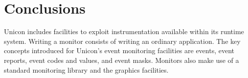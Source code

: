 \section{Conclusions}

Unicon includes facilities to exploit instrumentation available within its
runtime system.  Writing a monitor consists of writing an ordinary
application.  The key concepts introduced for Unicon's event monitoring
facilities are events, event reports, event codes and values, and event
masks.  Monitors also make use of a standard monitoring library and the
graphics facilities.
